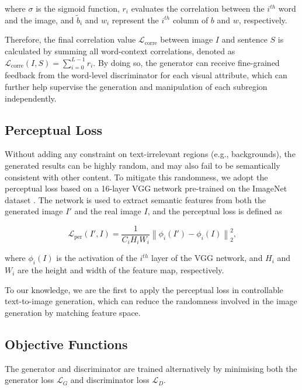 where $\sigma$ is the sigmoid function, $r_i$ evaluates the correlation between the $i^{th}$ word and the image, and $\tilde{b}_i$ and $w_{i}$ represent the $i^{th}$ column of $b$ and $w$, respectively.

Therefore, the final correlation value $\mathcal{L}_\text{corre}$ between image $I$ and sentence $S$ is calculated by summing all word-context correlations, denoted as $\mathcal{L}_\text{corre}(I,S)=\sum ^{L-1}_{i=0}r_{i}$. By doing so, the generator can receive fine-grained feedback from the word-level discriminator for each visual attribute, which can further help supervise the generation and manipulation of each subregion independently.

\subsection{Perceptual Loss}
\label{sec:semantic}
Without {adding} any constraint on text-irrelevant regions (e.g., backgrounds), the generated results can be highly random, and may also fail to be semantically consistent with other content. To mitigate this randomness, we adopt the perceptual loss \cite{johnson2016perceptual} based on a 16-layer VGG network \cite{simonyan2014very} pre-trained on the ImageNet dataset \cite{russakovsky2015imagenet}. The network is used to extract semantic features from both the generated image ${I}'$ and the real image $I$, and the  perceptual loss is defined as

\begin{equation}
\mathcal{L}_\text{per}({I'},I)=\frac{1}{C_{i}H_{i}W_{i}} \left \| \phi_{i}({I'})-\phi_{i}(I) \right \|^2_2
\textrm{,}
\end{equation}

where $\phi_{i}(I)$ is the activation of the $i^{th}$ layer of the VGG network, and $H_i$ and $W_i$ are the height and width of the feature map, respectively.

To our knowledge, we are the first to apply the perceptual loss \cite{johnson2016perceptual} in controllable text-to-image generation, {which can} reduce the randomness involved in the image generation by matching feature space. 

\subsection{Objective Functions}
\label{obj}
The generator and discriminator are trained alternatively by minimising both the generator loss $\mathcal{L}_G$ and discriminator loss $\mathcal{L}_D$.

